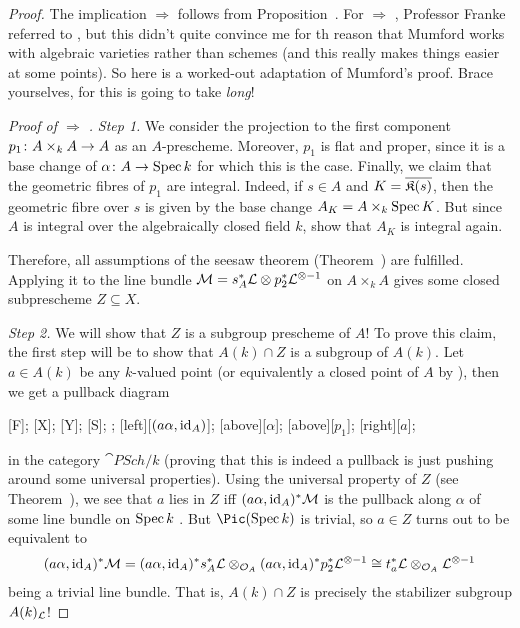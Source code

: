 \documentclass[a4paper,parskip=half,numbers=enddot, DIV=12]{scrreprt}
\begin{document}
\begin{proof}
	The implication  $\Rightarrow$  follows from Proposition~. For  $\Rightarrow$ , Professor Franke referred to \cite[\S6 Application~1]{mumford1974abelian}, but this didn't quite convince me for th reason that Mumford works with algebraic varieties rather than schemes (and this really makes things easier at some points). So here is a worked-out adaptation of Mumford's proof. Brace yourselves, for this is going to take \emph{long}!
	
	\emph{Proof of  $\Rightarrow$ .}
	\emph{Step 1.} We consider the projection to the first component $p_1\colon A\times_kA\morphism A$ as an $A$-prescheme. Moreover, $p_1$ is flat and proper, since it is a base change of $\alpha\colon A\morphism\Spec k$ for which this is the case. Finally, we claim that the geometric fibres of $p_1$ are integral. Indeed, if $s\in A$ and $K=\overline{\mathfrak{K}(s)}$, then the geometric fibre over $s$ is given by the base change $A_K=A\times_k\operatorname{Spec} K$. But since $A$ is integral over the algebraically closed field $k$, \cite[ and ]{stacks-project} show that $A_K$ is integral again.
	
	Therefore, all assumptions of the seesaw theorem (Theorem~) are fulfilled. Applying it to the line bundle $\mathcal{M}=s_A^*\mathcal{L}\otimes p_2^*\mathcal{L}^{\otimes-1}$ on $A\times_kA$ gives some closed subprescheme $Z\subseteq X$.
	
	\emph{Step 2.} We will show that $Z$ is a subgroup prescheme of $A$! To prove this claim, the first step will be to show that $A(k)\cap Z$ is a subgroup of $A(k)$. Let $a\in A(k)$ be any $k$-valued point (or equivalently a closed point of $A$ by ), then we get a pullback diagram
	\begin{diagram*}
		[F];
		[X];
		[Y];
		[S];
		;
		\scriptsize
		[$(a\alpha,\operatorname{id}_A)$];
		[above][$\alpha$];
		[above][$p_1$];
		[right][$a$];
	\end{diagram*}
	in the category $\cat{PSch}/k$ (proving that this is indeed a pullback is just pushing around some universal properties). Using the universal property of $Z$ (see Theorem~), we see that $a$ lies in $Z$ iff $(a\alpha,\operatorname{id}_A)^*\mathcal{M}$ is the pullback along $\alpha$ of some line bundle on $\operatorname{Spec} k$ . But $\Pic(\Spec k)$ is trivial, so $a\in Z$ turns out to be equivalent to
	\begin{align*}
		(a\alpha,\operatorname{id}_A)^*\mathcal{M}=(a\alpha,\operatorname{id}_A)^*s_A^*\mathcal{L}\otimes_{\mathcal{O}_A}(a\alpha,\operatorname{id}_A)^*p_2^*\mathcal{L}^{\otimes-1}\cong t_a^*\mathcal{L}\otimes_{\mathcal{O}_A}\mathcal{L}^{\otimes -1}
	\end{align*}
	 being a trivial line bundle. That is, $A(k)\cap Z$ is precisely the stabilizer subgroup $A(k)_{\mathcal{L}}$!
	 

\end{proof}
\end{document}
